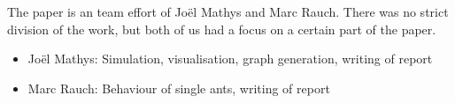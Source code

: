 The paper is an team effort of Jo\"el Mathys and Marc Rauch. There was no strict division of the work, but both of us had a focus on a certain part of the paper.
\begin{itemize}
  \item Jo\"el Mathys: Simulation, visualisation, graph generation, writing of report
  \item Marc Rauch: Behaviour of single ants, writing of report
\end{itemize}

